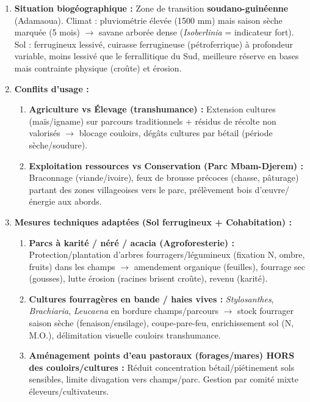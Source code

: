 \documentclass[11pt]{article}
\begin{document}
\begin{corrige}
\begin{enumerate}
    \item \textbf{Situation biogéographique :} Zone de transition \textbf{soudano-guinéenne} (Adamaoua). Climat : pluviométrie élevée (1500 mm) mais saison sèche marquée (5 mois) $\rightarrow$ savane arborée dense (\emph{Isoberlinia} = indicateur fort). Sol : ferrugineux lessivé, cuirasse ferrugineuse (pétroferrique) à profondeur variable, moins lessivé que le ferrallitique du Sud, meilleure réserve en bases mais contrainte physique (croûte) et érosion.
    \item \textbf{Conflits d'usage :}
        \begin{enumerate}
            \item \textbf{Agriculture vs Élevage (transhumance) :} Extension cultures (maïs/igname) sur parcours traditionnels + résidus de récolte non valorisés $\rightarrow$ blocage couloirs, dégâts cultures par bétail (période sèche/soudure).
            \item \textbf{Exploitation ressources vs Conservation (Parc Mbam-Djerem) :} Braconnage (viande/ivoire), feux de brousse précoces (chasse, pâturage) partant des zones villageoises vers le parc, prélèvement bois d'œuvre/énergie aux abords.
        \end{enumerate}
    \item \textbf{Mesures techniques adaptées (Sol ferrugineux + Cohabitation) :}
        \begin{enumerate}
            \item \textbf{Parcs à karité / néré / acacia (Agroforesterie) :} Protection/plantation d'arbres fourragers/légumineux (fixation N, ombre, fruits) dans les champs $\rightarrow$ amendement organique (feuilles), fourrage sec (gousses), lutte érosion (racines brisent croûte), revenu (karité).
            \item \textbf{Cultures fourragères en bande / haies vives :} \emph{Stylosanthes}, \emph{Brachiaria}, \emph{Leucaena} en bordure champs/parcours $\rightarrow$ stock fourrager saison sèche (fenaison/ensilage), coupe-pare-feu, enrichissement sol (N, M.O.), délimitation visuelle couloirs transhumance.
            \item \textbf{Aménagement points d'eau pastoraux (forages/mares) HORS des couloirs/cultures :} Réduit concentration bétail/piétinement sols sensibles, limite divagation vers champs/parc. Gestion par comité mixte éleveurs/cultivateurs.
        \end{enumerate}

\end{enumerate}
\end{corrige}
\end{document}
